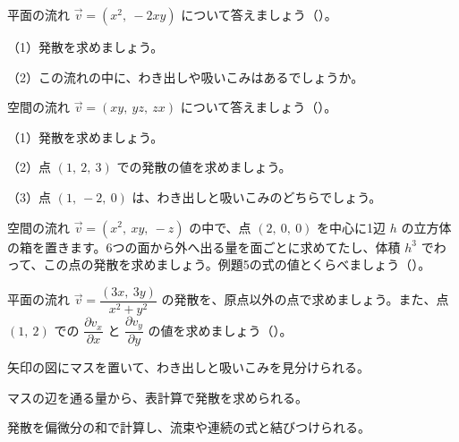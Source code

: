 
\bkproblem 平面の流れ $\vec v=(x^2,\ -2xy)$ について答えましょう\mbox{（）}。\par
（1）発散を求めましょう。\par
（2）この流れの中に、わき出しや吸いこみはあるでしょうか。

\bkproblem 空間の流れ $\vec v=(xy,\ yz,\ zx)$ について答えましょう\mbox{（）}。\par
（1）発散を求めましょう。\par
（2）点 $(1,\ 2,\ 3)$ での発散の値を求めましょう。\par
（3）点 $(1,\ -2,\ 0)$ は、わき出しと吸いこみのどちらでしょう。

\bkproblem 空間の流れ $\vec v=(x^2,\ xy,\ -z)$ の中で、点 $(2,\ 0,\ 0)$ を中心に1辺 $h$ の立方体の箱を置きます。6つの面から外へ出る量を面ごとに求めてたし、体積 $h^3$ でわって、この点の発散を求めましょう。例題5の式の値とくらべましょう\mbox{（）}。

\bkproblem 平面の流れ $\vec v=\dfrac{(3x,\ 3y)}{x^2+y^2}$ の発散を、原点以外の点で求めましょう。また、点 $(1,\ 2)$ での $\dfrac{\partial v_x}{\partial x}$ と $\dfrac{\partial v_y}{\partial y}$ の値を求めましょう\mbox{（）}。

\begin{furikaeri}
\begin{checklist}
\item 矢印の図にマスを置いて、わき出しと吸いこみを見分けられる。
\item マスの辺を通る量から、表計算で発散を求められる。
\item 発散を偏微分の和で計算し、流束や連続の式と結びつけられる。
\end{checklist}
\end{furikaeri}

